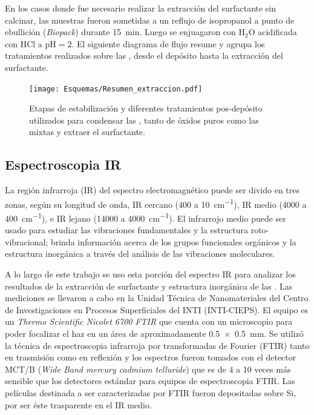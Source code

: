 		En los casos donde fue necesario realizar la extracción del surfactante sin calcinar, las muestras fueron sometidas a un reflujo de isopropanol a punto de ebullición (\textit{Biopack}) durante \SI{15}{\minute}. Luego se enjuagaron con H$_2$O acidificada con HCl a $\text{pH}=2$. El siguiente diagrama de flujo resume y agrupa los tratamientos realizados sobre las \pdm, desde el depósito hasta la extracción del surfactante.
		
				\begin{figure}[ht!]
						  \begin{center}
						  \texttt{[image: Esquemas/Resumen\_extraccion.pdf]}
						  \caption[Tratamientos pos-depósito de \pdm]{Etapas de estabilización y diferentes tratamientos pos-depósito utilizados para condensar las \pdm\space, tanto de óxidos puros como las mixtas y extraer el surfactante.}
						  \label{esq:peliculas_meso_tratamientos}
						  \end{center}
						  \end{figure}

	\pagebreak \subsection{Espectroscopia IR}\label{sec:IR}

		La región infrarroja (IR) del  espectro electromagnético puede ser divido en tres zonas, según su longitud de onda, IR cercano (400 a \SI{10}{\cm^{-1}}), IR medio (4000 a \SI{400}{\cm^{-1}}), e IR lejano (14000 a \SI{4000}{\cm^{-1}}). El infrarrojo medio puede ser usado para estudiar las vibraciones fundamentales y la estructura roto-vibracional; brinda información acerca de los grupos funcionales orgánicos y la estructura inorgánica a través del análisis de las vibraciones moleculares.\cite{Atkins2006,Barrow1962,Stuart2004} 
		
		A lo largo de este trabajo se uso esta porción del espectro IR para analizar los resultados de la extracción de surfactante y estructura inorgánica de las \pdm. Las mediciones se llevaron a cabo en la Unidad Técnica de Nanomateriales del Centro de Investigaciones en Procesos Superficiales del INTI (INTI-CIEPS). El equipo es un \textit{Thermo Scientific Nicolet 6700 FTIR} que cuenta con un microscopio para poder focalizar el haz en un área de aproximadamente \SI{0.5x0.5}{\mm}. Se utilizó la técnica de espectroscopia infrarroja por transformadas de Fourier (FTIR) tanto en trasmisión como en reflexión y los espectros fueron tomados con el detector MCT/B (\textit{Wide Band mercury cadmium telluride}) que es de 4 a 10 veces más sensible que los detectores estándar para equipos de espectroscopia FTIR.\cite{Nicholet2007} Las películas destinada a ser caracterizadas por FTIR fueron depositadas sobre Si, por ser éste trasparente en el IR medio.

